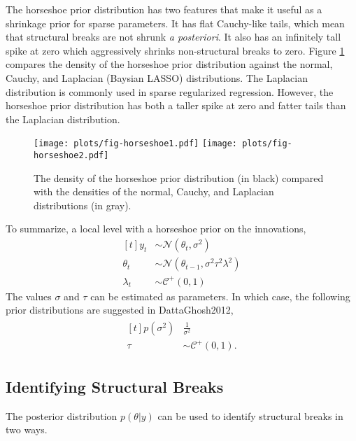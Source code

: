 \documentclass{article}
\newcommand{\paren}[1]{\ensuremath{\left(#1\right)}}
\newcommand{\dnorm}[1]{\ensuremath{\mathcal{N}\paren{#1}}}
\newcommand{\dhalfcauchy}[1]{\ensuremath{\mathcal{C}^{+}\paren{#1}}}
\begin{document}
The horseshoe prior distribution has two features that make it useful as a shrinkage prior for sparse parameters.
It has flat Cauchy-like tails, which mean that structural breaks are not shrunk \textit{a posteriori}.
It also has an infinitely tall spike at zero which aggressively shrinks non-structural breaks to zero.
Figure \ref{fig:horseshoe} compares the density of the horseshoe prior distribution against the normal, Cauchy, and Laplacian (Baysian LASSO) distributions.
The Laplacian distribution is commonly used in sparse regularized regression.
However, the horseshoe prior distribution has both a taller spike at zero and fatter tails than the Laplacian distribution.

\begin{figure}
  \centering
  \texttt{[image: plots/fig-horseshoe1.pdf]}
  \texttt{[image: plots/fig-horseshoe2.pdf]}
  \caption{The density of the horseshoe prior distribution (in black) compared with the densities of the normal, Cauchy, and Laplacian distributions (in gray).}
  \label{fig:horseshoe}
\end{figure}


To summarize, a local level with a horseshoe prior on the innovations,
\begin{equation}
  \label{eq:3}
  \begin{aligned}[t]
    y_{t} & \sim \dnorm{\theta_{t}, \sigma^{2}} \\
    \theta_{t} & \sim \dnorm{\theta_{t - 1}, \sigma^{2} \tau^{2} \lambda^{2}} \\
    \lambda_{t} & \sim \dhalfcauchy{0, 1}
  \end{aligned}
\end{equation}
The values $\sigma$ and $\tau$ can be estimated as parameters. 
In which case, the following prior distributions are suggested in \textcite{CarvalhoPolsonScott2010}{DattaGhosh2012},
\begin{align}
  \label{eq:9}
  \begin{aligned}[t]
    p(\sigma^{2}) & \frac{1}{\sigma^{2}}  \\
    \tau &\sim \dhalfcauchy{0, 1} \text{.}
  \end{aligned}
\end{align}

\subsection{Identifying Structural Breaks}
\label{sec:ident-struct-breaks}

The posterior distribution $p(\theta | y)$ can be used to identify structural breaks in two ways. 
\end{document}
